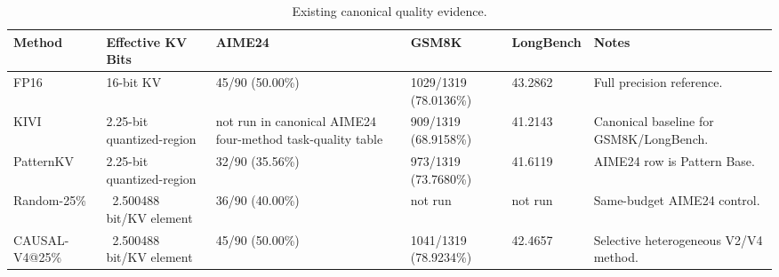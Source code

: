 \begin{table}[t]
\centering
\caption{Existing canonical quality evidence.}
\label{tab:quality-main}
\begin{tabular}{llllll}
\toprule
Method & Effective KV Bits & AIME24 & GSM8K & LongBench & Notes \\
\midrule
FP16 & 16-bit KV & 45/90 (50.00\%) & 1029/1319 (78.0136\%) & 43.2862 & Full precision reference. \\
KIVI & 2.25-bit quantized-region & not run in canonical AIME24 four-method task-quality table & 909/1319 (68.9158\%) & 41.2143 & Canonical baseline for GSM8K/LongBench. \\
PatternKV & 2.25-bit quantized-region & 32/90 (35.56\%) & 973/1319 (73.7680\%) & 41.6119 & AIME24 row is Pattern Base. \\
Random-25\% & ~2.500488 bit/KV element & 36/90 (40.00\%) & not run & not run & Same-budget AIME24 control. \\
CAUSAL-V4@25\% & ~2.500488 bit/KV element & 45/90 (50.00\%) & 1041/1319 (78.9234\%) & 42.4657 & Selective heterogeneous V2/V4 method. \\
\bottomrule
\end{tabular}
\end{table}
